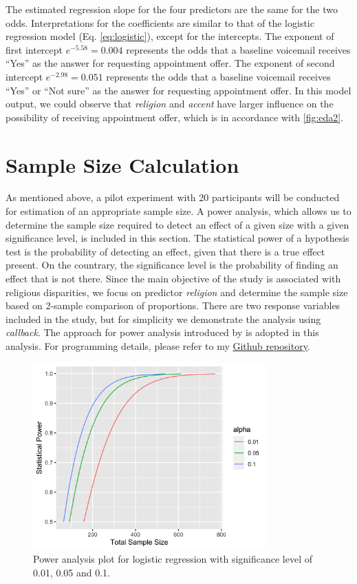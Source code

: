\documentclass[11pt]{article}
\begin{document}
The estimated regression slope for the four predictors are the same for the two odds. Interpretations for the coefficients are similar to that of the logistic regression model (Eq. \ref{eq:logistic}), except for the intercepts. The exponent of first intercept $e^{-5.58} = 0.004$ represents the odds that a baseline voicemail receives ``Yes'' as the answer for requesting appointment offer. The exponent of second intercept $e^{-2.98} = 0.051$ represents the odds that a baseline voicemail receives ``Yes'' or ``Not sure'' as the answer for requesting appointment offer. In this model output, we could observe that \textit{religion} and \textit{accent} have larger influence on the possibility of receiving appointment offer, which is in accordance with \autoref{fig:eda2}. 


\section{Sample Size Calculation}
As mentioned above, a pilot experiment with 20 participants will be conducted for estimation of an appropriate sample size. A power analysis, which allows us to determine the sample size required to detect an effect of a given size with a given significance level, is included in this section. The statistical power of a hypothesis test is the probability of detecting an effect, given that there is a true effect present. On the countrary, the significance level is the probability of finding an effect that is not there. Since the main objective of the study is associated with religious disparities, we focus on predictor \textit{religion} and determine the sample size based on 2-sample comparison of proportions. There are two response variables included in the study, but for simplicity we demonstrate the analysis using \textit{callback}. The approach for power analysis introduced by \citet{wang2007} is adopted in this analysis. For programming details, please refer to my \href{https://github.com/NingShen1997/STAT551_Case34}{Github repository}.


\begin{figure}[!b] 
    \centering
    \includegraphics[width=0.8\textwidth]{../../Plots/power_analysis.png}
    \caption{Power analysis plot for logistic regression with significance level of 0.01, 0.05 and 0.1.}
    \label{fig:power_analysis}
\end{figure} 
\end{document}
